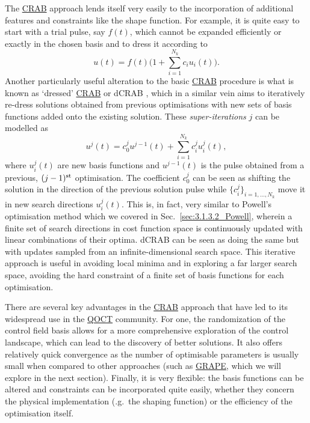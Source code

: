 \documentclass[a4paper,oneside,11pt]{book}
\newcommand{\acrref}[1]{\hyperref[acr:#1]{#1}}
\begin{document}
The \acrref{CRAB} approach lends itself very easily to the incorporation of additional features and constraints like the shape function. For example, it is quite easy to start with a trial pulse, say $f(t)$, which cannot be expanded efficiently or exactly in the chosen basis and to dress it according to
\begin{equation}\label{eq:trial_pulse_CRAB}
    u(t) = f(t)\Bigg(1 + \sum_{i = 1}^{N_k} c_i u_i(t)\Bigg).
\end{equation}
Another particularly useful alteration to the basic \acrref{CRAB} procedure is what is known as `dressed' \acrref{CRAB} or dCRAB \cite{rach_dressing_2015}, which in a similar vein aims to iteratively re-dress solutions obtained from previous optimisations with new sets of basis functions added onto the existing solution. These \emph{super-iterations} $j$ can be modelled as
\begin{equation}\label{eq:dCRAB}
    u^j(t) = c_0^j u^{j-1}(t) + \sum_{i = 1}^{N_k} c_i^j u^j_i(t),
\end{equation}
where $u^j_i(t)$ are new basis functions and $u^{j-1}(t)$ is the pulse obtained from a previous, $(j-1)^{\rm st}$ optimisation. The coefficient $c_0^j$ can be seen as shifting the solution in the direction of the previous solution pulse while $\{ c_i^j\}_{i = 1, ..., N_k}$ move it in new search directions $u^j_i(t)$. This is, in fact, very similar to Powell's optimisation method which we covered in Sec.~\ref{sec:3.1.3.2_Powell}, wherein a finite set of search directions in cost function space is continuously updated with linear combinations of their optima. dCRAB can be seen as doing the same but with updates sampled from an infinite-dimensional search space. This iterative approach is useful in  avoiding local minima and in exploring a far larger search space, avoiding the hard constraint of a finite set of basis functions for each optimisation. 

There are several key advantages in the \acrref{CRAB} approach that have led to its widespread use in the \acrref{QOCT} community. For one, the randomization of the control field basis allows for a more comprehensive exploration of the control landscape, which can lead to the discovery of better solutions. It also offers relatively quick convergence as the number of optimisable parameters is usually small when compared to other approaches (such as \acrref{GRAPE}, which we will explore in the next section). Finally, it is very flexible: the basis functions can be altered and constraints can be incorporated quite easily, whether they concern the physical implementation (\@e.g.~the shaping function) or the efficiency of the optimisation itself.
\end{document}
